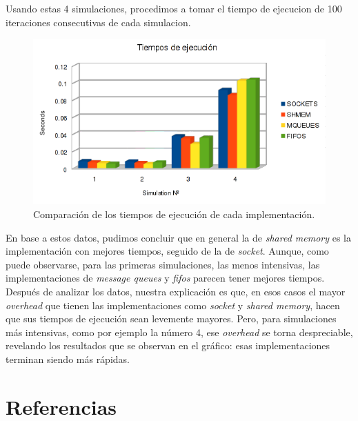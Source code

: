 \documentclass[a4paper,10pt]{article}
\begin{document}
Usando estas 4 simulaciones, procedimos a tomar el tiempo de ejecucion de 100 iteraciones consecutivas de cada simulacion.

\begin{figure}[H]
\begin{center}
 \includegraphics[scale=0.75]{./images/runningTimesChart.png}
  \caption{Comparación de los tiempos de ejecución de cada implementación.}
\end{center}
\end{figure}

En base a estos datos, pudimos concluir que en general la de \textit{shared memory} es la implementación con mejores tiempos, seguido de la de \textit{socket}. Aunque,
como puede observarse, para las primeras simulaciones, las menos intensivas, las implementaciones de \textit{message queues} y \textit{fifos} parecen tener mejores tiempos. 
Después de analizar los datos, nuestra explicación es que, en esos casos el mayor \textit{overhead} que tienen las implementaciones como \textit{socket} y 
\textit{shared memory}, hacen que sus tiempos de ejecución sean levemente mayores. 
Pero, para simulaciones más intensivas, como por ejemplo la número 4, ese \textit{overhead} se torna despreciable, revelando los resultados que se observan en el gráfico: esas implementaciones terminan siendo más rápidas.\\

\newpage     
\section{Referencias}
\end{document}
